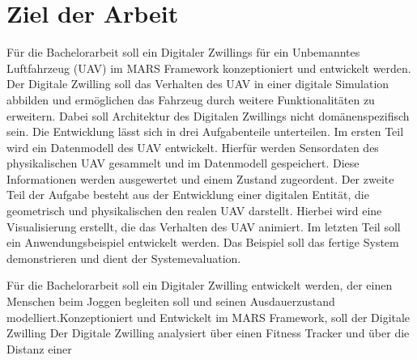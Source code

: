 \section{Ziel der Arbeit}

Für die Bachelorarbeit soll ein Digitaler Zwillings für ein Unbemanntes Luftfahrzeug (UAV) im MARS Framework konzeptioniert und entwickelt werden. Der Digitale Zwilling soll das Verhalten des UAV in einer digitale Simulation abbilden und ermöglichen das Fahrzeug durch weitere Funktionalitäten zu erweitern. Dabei soll Architektur des Digitalen Zwillings nicht domänenspezifisch sein. \newline
Die Entwicklung lässt sich in drei Aufgabenteile unterteilen.
Im ersten Teil wird ein Datenmodell des UAV entwickelt. Hierfür werden Sensordaten des physikalischen UAV gesammelt und im Datenmodell gespeichert. Diese Informationen werden ausgewertet und einem Zustand zugeordent. \newline
Der zweite Teil der Aufgabe besteht aus der Entwicklung einer digitalen Entität, die geometrisch und physikalischen den realen UAV darstellt. Hierbei wird eine Visualisierung erstellt, die das Verhalten des UAV animiert. \newline
Im letzten Teil soll ein Anwendungsbeispiel entwickelt werden. Das Beispiel soll das fertige System demonstrieren und dient der Systemevaluation.

Für die Bachelorarbeit soll ein Digitaler Zwilling entwickelt werden, der einen Menschen beim Joggen begleiten soll und seinen Ausdauerzustand modelliert.Konzeptioniert und Entwickelt im MARS Framework, soll der Digitale Zwilling  Der Digitale Zwilling analysiert über einen Fitness Tracker und über die Distanz einer 





